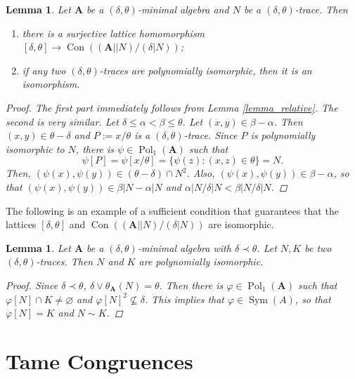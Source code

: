 \documentclass{amsart}
\theoremstyle{plain}
\newtheorem{lemma}[theorem]{Lemma}
\theoremstyle{definition}
\theoremstyle{remark}
\def\phi{\varphi}
\DeclareMathOperator{\Con}{Con}
\DeclareMathOperator{\Pol}{Pol}
\DeclareMathOperator{\Sym}{Sym}
\begin{document}
\begin{lemma}
    Let $\mathbf{A}$ be a $(\delta, \theta)$-minimal algebra and $N$ be a $(\delta, \theta)$-trace. 
    Then 
    \begin{enumerate}
        \item there is a surjective lattice homomorphism $[\delta, \theta] \to \Con((\mathbf{A}||N)/(\delta|N))$; 
        \item if any two $(\delta, \theta)$-traces are polynomially isomorphic, then it is an isomorphism. 
    \end{enumerate}
    \begin{proof}
        The first part immediately follows from Lemma \ref{lemma_relative}.
        The second is very similar.
        Let $\delta \le \alpha < \beta \le \theta$. 
        Let $(x,y) \in \beta - \alpha$. 
        Then $(x,y) \in \theta - \delta$ and $P:=x/\theta$ is a $(\delta, \theta)$-trace. 
        Since $P$ is polynomially isomorphic to $N$, there is $\psi \in \Pol_1(\mathbf{A})$ such that 
        \begin{equation*}
            \psi[P] = \psi[x/\theta] =\{\psi(z): (x,z) \in \theta\}= N \text{.}
        \end{equation*}
        Then, $(\psi(x),\psi(y)) \in (\theta - \delta) \cap N^2$.
        Also, $(\psi(x),\psi(y)) \in \beta - \alpha$, so that $(\psi(x),\psi(y)) \in \beta|N - \alpha|N$ and $\alpha|N/\delta|N < \beta|N/\delta|N$. 
    \end{proof}
\end{lemma}

The following is an example of a sufficient condition that guarantees that the lattices $[\delta, \theta]$ and $\Con((\mathbf{A}||N)/(\delta|N))$ are isomorphic. 

\begin{lemma}
    Let $\mathbf{A}$ be a $(\delta, \theta)$-minimal algebra with $\delta \prec \theta$. 
    Let $N,K$ be two $(\delta, \theta)$-traces. 
    Then $N$ and $K$ are polynomially isomorphic. 
    \begin{proof}
        Since $\delta \prec \theta$, $\delta \lor \theta_{\mathbf{A}}(N)=\theta$. 
        Then there is $\phi \in \Pol_1(\mathbf{A})$ such that $\phi[N] \cap K \neq \varnothing$ and $\phi[N]^2 \nsubseteq \delta$.
        This implies that $\phi \in \Sym(A)$, so that $\phi[N]=K$ and $N \sim K$.  
    \end{proof}
\end{lemma}

\section{Tame Congruences}
\end{document}
